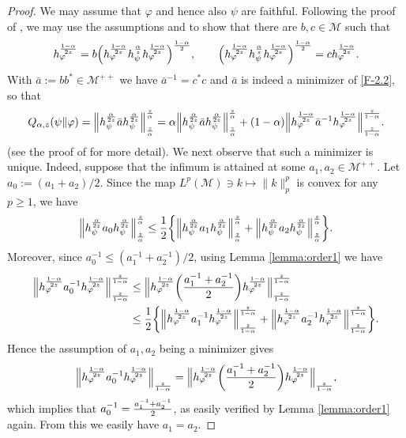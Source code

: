 \documentclass[12pt]{article}
\theoremstyle{definition}
\theoremstyle{remark}
\numberwithin{equation}{section}
\def\cM{\mathcal M}
\def\Me{\mathcal M}
\def\ffi{\varphi}
\begin{document}
\begin{proof} We may assume that $\varphi$ and hence also $\psi$ {are} faithful. Following
 the proof of \cite[Theorem 1(vi)]{kato2023onrenyi},  we may use the
assumptions and \cite[Lemma A.58]{hiai2021quantum} to show  that there are $b,c\in\cM$ such that
\begin{align}\label{eq:bc}
h_\ffi^{1-\alpha\over2z}
=b\Bigl(h_\ffi^{1-\alpha\over2z}h_\psi^{\alpha\over z}h_\ffi^{1-\alpha\over2z}\Bigr)^{1-\alpha\over2},\qquad
\Bigl(h_\ffi^{1-\alpha\over2z}h_\psi^{\alpha\over z}h_\ffi^{1-\alpha\over2z}\Bigr)^{1-\alpha\over2}
=ch_\ffi^{1-\alpha\over2z}.
\end{align}
With $\bar a:=bb^*\in\cM^{++}$ we have  $\bar a^{-1}=c^*c$ and $\bar a$ is indeed a minimizer of
\eqref{F-2.2}, so that
\begin{align}\label{eq:infimum}
Q_{\alpha,z}(\psi\|\ffi)
=\Big\|h_\psi^{\alpha\over2z}\bar ah_\psi^{\alpha\over2z}\Big\|_{z\over\alpha}^{z\over\alpha}
=\alpha\Big\|h_\psi^{\alpha\over2z}\bar ah_\psi^{\alpha\over2z}\Big\|_{z\over\alpha}^{z\over\alpha}
+(1-\alpha)\Big\|h_\ffi^{1-\alpha\over2z}\bar a^{-1}h_\ffi^{1-\alpha\over2z}\Big\|_{z\over
1-\alpha}^{z\over 1-\alpha}.
\end{align}
(see the proof of \cite[Theorem 1(vi)]{kato2023onrenyi} for more detail).
We next observe that such a minimizer is unique. Indeed, suppose that the infimum is
attained  at some $a_1,a_2\in \Me^{++}$. Let $a_0:=(a_1+a_2)/2$. Since the map 
$L^{p}(\cM)\ni k\mapsto\|k\|_{p}^{p}$ is convex for any $p\ge 1$, we have 
\[
\Big\|h_\psi^{\alpha\over2z}a_0h_\psi^{\alpha\over2z}\Big\|_{z\over\alpha}^{z\over\alpha}
\le{1\over2}\biggl\{\Big\|h_\psi^{\alpha\over2z}a_1
h_\psi^{\alpha\over2z}\Big\|_{z\over\alpha}^{z\over\alpha}
+\Big\|h_\psi^{\alpha\over2z}a_2h_\psi^{\alpha\over2z}\Big\|_{z\over\alpha}^{z\over\alpha}\biggr\}.
\]
Moreover, {since $a_0^{-1}\le(a_1^{-1}+a_2^{-1})/2$}, using Lemma \ref{lemma:order1}
we have
\begin{align*}
\Big\|h_\ffi^{1-\alpha\over2z}a_0^{-1}h_\ffi^{1-\alpha\over2z}\Big\|_{z\over1-\alpha}^{z\over1-\alpha}
&\le\Big\|h_\ffi^{1-\alpha\over2z}\biggl({a_1^{-1}+a_2^{-1}\over2}\biggr)
h_\ffi^{1-\alpha\over2z}\Big\|_{z\over1-\alpha}^{z\over1-\alpha} \\
&\le{1\over2}\biggl\{\Big\|h_\ffi^{1-\alpha\over2z}a_1^{-1}
h_\ffi^{1-\alpha\over2z}\Big\|_{z\over1-\alpha}^{z\over1-\alpha}
+\Big\|h_\ffi^{1-\alpha\over2z}a_2^{-1}
h_\ffi^{1-\alpha\over2z}\Big\|_{z\over1-\alpha}^{z\over1-\alpha}\biggr\}.
\end{align*}
Hence the assumption of $a_1,a_2$ being a minimizer gives
\[
\Big\|h_\ffi^{1-\alpha\over2z}a_0^{-1}h_\ffi^{1-\alpha\over2z}\Big\|_{z\over1-\alpha}
=\Big\|h_\ffi^{1-\alpha\over2z}\biggl({a_1^{-1}+a_2^{-1}\over2}\biggr)
h_\ffi^{1-\alpha\over2z}\Big\|_{z\over1-\alpha},
\]
which implies that $a_0^{-1}={a_1^{-1}+a_2^{-1}\over2}$, as easily verified by Lemma \ref{lemma:order1}
again. From this we easily have $a_1=a_2$.


\end{proof}
\end{document}
